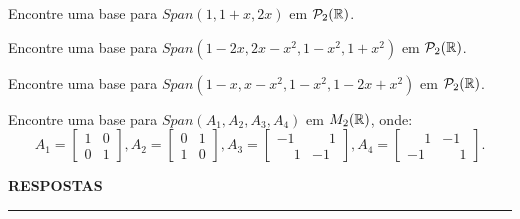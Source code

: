 \documentclass[12pt]{exam}
\begin{document}
    \begin{exercicio}
        Encontre uma base para $Span(1, 1 + x, 2x)$ em $\mathcal{P}_2(\mathbb{R})$.
    \end{exercicio}

    \begin{exercicio}
        Encontre uma base para $Span(1 - 2x, 2x - x^2, 1 - x^2, 1 + x^2)$ em $\mathcal{P}_2(\mathbb{R})$.
    \end{exercicio}

    \begin{exercicio}
        Encontre uma base para $Span(1 - x, x - x^2, 1 - x^2, 1 - 2x + x^2)$ em $\mathcal{P}_2(\mathbb{R})$.
    \end{exercicio}

    \begin{exercicio}
        Encontre uma base para $Span(A_1, A_2, A_3, A_4)$ em $M_2(\mathbb{R})$, onde:
        \[
        A_1 = \begin{bmatrix}
            1 & 0\\
            0 & 1
        \end{bmatrix},
        A_2 = \begin{bmatrix}
            0 & 1\\
            1 & 0
        \end{bmatrix},
        A_3 = \begin{bmatrix}
            -1 & \phantom{-} 1\\
            \phantom{-} 1 & -1
        \end{bmatrix},
        A_4 = \begin{bmatrix}
            \phantom{-} 1 & -1\\
            -1 & \phantom{-} 1
        \end{bmatrix}.
        \]
    \end{exercicio}

    \newpage


    \begin{center}
        {\large\bf RESPOSTAS}
    \end{center}

    \hrule

    
\end{document}
